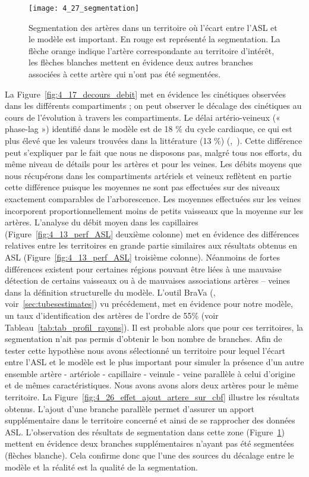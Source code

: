 \begin{figure}[!b]
\centering
\texttt{[image: 4\_27\_segmentation]}
\caption{Segmentation des artères dans un territoire où l'écart entre l'ASL et le modèle est important. En rouge est représenté la segmentation. La flèche orange indique l'artère correspondante au territoire d'intérêt, les flèches blanches mettent en évidence deux autres branches associées à cette artère qui n'ont pas été segmentées.}
\label{fig:4_27_segmentation}	
\end{figure}
La Figure~\ref{fig:4_17_decours_debit} met en évidence les cinétiques observées dans les différents compartiments ; on
peut observer le décalage des cinétiques au cours de l’évolution à travers les compartiments. Le délai
artério-veineux (« phase-lag ») identifié dans le modèle est de 18 \% du cycle cardiaque, ce qui est plus
élevé que les valeurs trouvées dans la littérature (13 \%) (\cite{Linninger2009},~\cite{Kim2007}). Cette différence peut s’expliquer par le fait que nous ne disposons pas, malgré tous nos efforts, du même niveau de détails pour les artères
et pour les veines. Les débits moyens que nous récupérons dans les compartiments artériels et veineux
reflètent en partie cette différence puisque les moyennes ne sont pas effectuées sur des niveaux
exactement comparables de l’arborescence. Les moyennes effectuées sur les veines incorporent
proportionnellement moins de petits vaisseaux que la moyenne sur les artères. L’analyse du débit
moyen dans les capillaires (Figure~\ref{fig:4_13_perf_ASL} deuxième colonne) met en évidence des différences relatives
entre les territoires en grande partie similaires aux résultats obtenus en ASL (Figure~\ref{fig:4_13_perf_ASL} troisième
colonne). Néanmoins de fortes différences existent pour certaines régions pouvant être liées à une mauvaise détection de certains vaisseaux ou à de
mauvaises associations artères – veines dans la définition structurelle du modèle. L'outil BraVa (\cite{Wright2013}, voir~\ref{sec:tubesestimates}) vu précédement, met en évidence pour notre modèle, un taux d'identification des artères de l'ordre de 55\% (voir Tableau~\ref{tab:tab_profil_rayons}). Il est probable alors que pour ces territoires, la segmentation n'ait pas permis d'obtenir le bon nombre de branches. Afin de tester cette hypothèse nous avons sélectionné un territoire pour lequel l'écart entre l'ASL et le modèle est le plus important pour simuler la présence d'un autre ensemble artère - artériole  - capillaire - veinule - veine parallèle à celui d'origine et de mêmes caractéristiques. Nous avons avons alors deux artères pour le même territoire. La Figure~\ref{fig:4_26_effet_ajout_artere_sur_cbf} illustre les résultats obtenus. L'ajout d'une branche parallèle permet d'assurer un apport supplémentaire dans le territoire concerné et ainsi de se rapprocher des données ASL. L'observation des résultats de segmentation dans cette zone (Figure~\ref{fig:4_27_segmentation}) mettent en évidence deux branches supplémentaires n'ayant pas été segmentées (flèches blanche). Cela confirme donc que l'une des sources du décalage entre le modèle et la réalité est la qualité de la segmentation.

